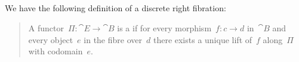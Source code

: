 \subsection{}

We have the following definition of a discrete right fibration:
\begin{quote}
	A functor~$Π \colon \cat{E} \to \cat{B}$ is a  if for every morphism~$f \colon c \to d$ in~$\cat{B}$ and every object~$e$ in the fibre over~$d$ there exists a unique lift of~$f$ along~$Π$ with codomain~$e$.
\end{quote}
